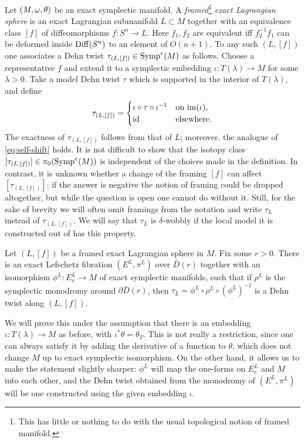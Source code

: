 \documentclass[10pt,letterpaper]{article}
\begin{document}
Let $(M,\omega,\theta)$ be an exact symplectic manifold. A {\em
framed}\footnote{This has little or nothing to do with the usual topological
notion of framed manifold.} {\em exact Lagrangian sphere} is an exact
Lagrangian submanifold $L \subset M$ together with an equivalence class $[f]$
of diffeomorphisms $f: S^n \rightarrow L$. Here $f_1,f_2$ are equivalent iff
$f_2^{-1}f_1$ can be deformed inside $\mathrm{Diff}(S^n)$ to an element of $O(n+1)$. To
any such $(L,[f])$ one associates a Dehn twist $\tau_{(L,[f])} \in \mathrm{Symp}^e(M)$
as follows. Choose a representative $f$ and extend it to a symplectic embedding
$\iota: T(\lambda) \rightarrow M$ for some $\lambda>0$. Take a model Dehn twist
$\tau$ which is supported in the interior of $T(\lambda)$, and define
\[
\tau_{(L,[f])} = \begin{cases}
 \iota \circ \tau \circ \iota^{-1} & \text{on $\mathrm{im}(\iota)$,} \\
 \mathrm{id} & \text{elsewhere.}
\end{cases}
\]
The exactness of $\tau_{(L,[f])}$ follows from that of $L$; moreover, the
analogue of \eqref{eq:self-shift} holds. It is not difficult to show that the
isotopy class $[\tau_{(L,[f])}] \in \pi_0(\mathrm{Symp}^e(M))$ is independent of the
choices made in the definition. In contrast, it is unknown whether a change of
the framing $[f]$ can affect $[\tau_{(L,[f])}]$; if the answer is negative the
notion of framing could be dropped altogether, but while the question is open
one cannot do without it. Still, for the sake of brevity we will often omit
framings from the notation and write $\tau_L$ instead of $\tau_{(L,[f])}$. We
will say that $\tau_L$ is $\delta$-wobbly if the local model it is constructed
out of has this property.

\begin{prop} \label{th:standard-fibrations}
Let $(L,[f])$ be a framed exact Lagrangian sphere in $M$. Fix some $r>0$. There
is an exact Lefschetz fibration $(E^L,\pi^L)$ over $\bar{D}(r)$ together with
an isomorphism $\phi^L: E^L_r \rightarrow M$ of exact symplectic manifolds,
such that if $\rho^L$ is the symplectic monodromy around $\partial \bar{D}(r)$,
then $\tau_L = \phi^L \circ \rho^L \circ (\phi^L)^{-1}$ is a Dehn twist along
$(L,[f])$.
\end{prop}

We will prove this under the assumption that there is an embedding $\iota:
T(\lambda) \rightarrow M$ as before, with $\iota^*\theta = \theta_T$. This is
not really a restriction, since one can always satisfy it by adding the
derivative of a function to $\theta$, which does not change $M$ up to exact
symplectic isomorphism. On the other hand, it allows us to make the statement
slightly sharper: $\phi^L$ will map the one-forms on $E^L_r$ and $M$ into each
other, and the Dehn twist obtained from the monodromy of $(E^L,\pi^L)$ will be
one constructed using the given embedding $\iota$.
\end{document}
